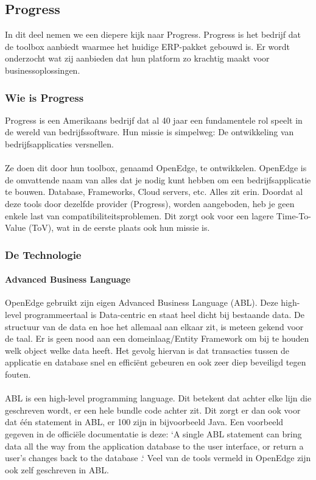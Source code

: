 \subsection{Progress}

In dit deel nemen we een diepere kijk naar Progress. Progress is het bedrijf dat de toolbox aanbiedt waarmee het huidige ERP-pakket gebouwd is. Er wordt onderzocht wat zij aanbieden dat hun platform zo krachtig maakt voor businessoplossingen.

\subsubsection{Wie is Progress}
Progress is een Amerikaans bedrijf dat al 40 jaar een fundamentele rol speelt in de wereld van bedrijfssoftware. Hun missie is simpelweg: De ontwikkeling van bedrijfsapplicaties versnellen. 
\\
\\
Ze doen dit door hun toolbox, genaamd OpenEdge, te ontwikkelen. OpenEdge is de omvattende naam van alles dat je nodig kunt hebben om een bedrijfsapplicatie te bouwen. Database, Frameworks, Cloud servers, etc. Alles zit erin. Doordat al deze tools door dezelfde provider (Progress), worden aangeboden, heb je geen enkele last van compatibiliteitsproblemen. Dit zorgt ook voor een lagere Time-To-Value (ToV), wat in de eerste plaats ook hun missie is.
\subsubsection{De Technologie}

\paragraph{Advanced Business Language}
OpenEdge gebruikt zijn eigen Advanced Business Language (ABL). Deze high-level programmeertaal is Data-centric en staat heel dicht bij bestaande data. De structuur van de data en hoe het allemaal aan elkaar zit, is meteen gekend voor de taal. Er is geen nood aan een domeinlaag/Entity Framework om bij te houden welk object welke data heeft. Het gevolg hiervan is dat transacties tussen de applicatie en database snel en efficiënt gebeuren en ook zeer diep beveiligd tegen fouten.
\\
\\
ABL is een high-level programming language. Dit betekent dat achter elke lijn die geschreven wordt, er een hele bundle code achter zit. Dit zorgt er dan ook voor dat één statement in ABL, er 100 zijn in bijvoorbeeld Java. Een voorbeeld gegeven in de officiële documentatie is deze: `A single ABL statement can bring data all the way from the application database to the user interface, or return a user's changes back to the database \autocite{Progress2026}.` Veel van de tools vermeld in OpenEdge zijn ook zelf geschreven in ABL.

